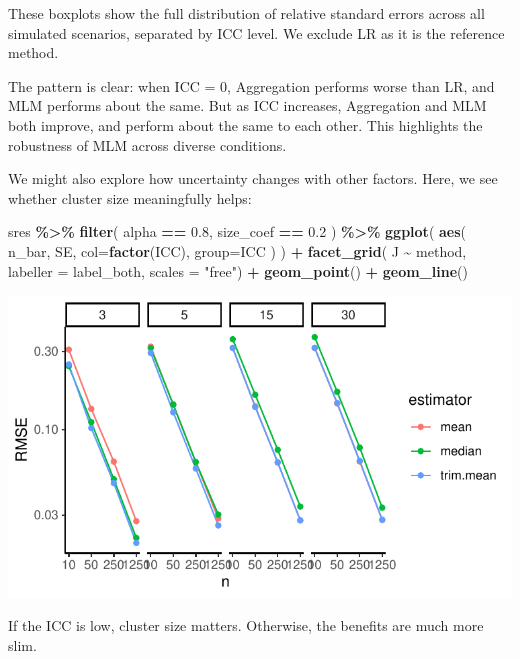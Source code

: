 \documentclass[
]{book}
\newenvironment{Shaded}{\begin{snugshade}}{\end{snugshade}}
\newcommand{\AttributeTok}[1]{\textcolor[rgb]{0.13,0.29,0.53}{#1}}
\newcommand{\FloatTok}[1]{\textcolor[rgb]{0.00,0.00,0.81}{#1}}
\newcommand{\FunctionTok}[1]{\textcolor[rgb]{0.13,0.29,0.53}{\textbf{#1}}}
\newcommand{\NormalTok}[1]{#1}
\newcommand{\SpecialCharTok}[1]{\textcolor[rgb]{0.81,0.36,0.00}{\textbf{#1}}}
\newcommand{\StringTok}[1]{\textcolor[rgb]{0.31,0.60,0.02}{#1}}
\begin{document}
These boxplots show the full distribution of relative standard errors across all simulated scenarios, separated by ICC level. We exclude LR as it is the reference method.

The pattern is clear: when ICC = 0, Aggregation performs worse than LR, and MLM performs about the same. But as ICC increases, Aggregation and MLM both improve, and perform about the same to each other.
This highlights the robustness of MLM across diverse conditions.

We might also explore how uncertainty changes with other factors.
Here, we see whether cluster size meaningfully helps:

\begin{Shaded}
\begin{Highlighting}[]
\NormalTok{sres }\SpecialCharTok{\%\textgreater{}\%}
  \FunctionTok{filter}\NormalTok{( alpha }\SpecialCharTok{==} \FloatTok{0.8}\NormalTok{, size\_coef }\SpecialCharTok{==} \FloatTok{0.2}\NormalTok{ ) }\SpecialCharTok{\%\textgreater{}\%}
\FunctionTok{ggplot}\NormalTok{( }\FunctionTok{aes}\NormalTok{( n\_bar, SE, }\AttributeTok{col=}\FunctionTok{factor}\NormalTok{(ICC), }\AttributeTok{group=}\NormalTok{ICC ) ) }\SpecialCharTok{+}
  \FunctionTok{facet\_grid}\NormalTok{( J }\SpecialCharTok{\textasciitilde{}}\NormalTok{ method, }\AttributeTok{labeller =}\NormalTok{ label\_both, }\AttributeTok{scales =} \StringTok{"free"}\NormalTok{) }\SpecialCharTok{+}
  \FunctionTok{geom\_point}\NormalTok{() }\SpecialCharTok{+} \FunctionTok{geom\_line}\NormalTok{()}
\end{Highlighting}
\end{Shaded}

\begin{center}\includegraphics[width=0.75\linewidth]{Designing-Simulations-in-R_files/figure-latex/unnamed-chunk-183-1} \end{center}

If the ICC is low, cluster size matters. Otherwise, the benefits are much more slim.
\end{document}

